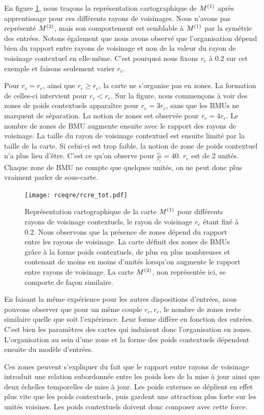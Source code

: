 \documentclass[../main]{subfiles}
\begin{document}
En figure \ref{fig:rcre}, nous traçons la représentation cartographique de $M^{({1})}$ après apprentissage pour ces différents rayons de voisinages. 
Nous n'avons pas représenté $M^{({2})}$, mais son comportement est semblable à $M^{({1})}$ par la symétrie des entrées.
Notons également que nous avons observé que l'organisation dépend bien du rapport entre rayons de voisinage et non de la valeur du rayon de voisinage contextuel en elle-même. C'est pourquoi nous fixons $r_e$ à $0.2$ sur cet exemple et faisons seulement varier $r_c$.

Pour $r_c = r_e$, ainsi que $r_c \geq r_e$, la carte ne s'organise pas en zones. 
La formation de celles-ci intervient pour $r_c < r_e$. Sur la figure, nous commençons à voir des zones de poids contextuels apparaître pour $r_e = 3r_c$, sans que les BMUs ne marquent de séparation. La notion de zones est observée pour $r_e = 4r_c$.
Le nombre de zones de BMU augmente ensuite avec le rapport des rayons de voisinage. La taille du rayon de voisinage contextuel est ensuite limité par la taille de la carte. Si celui-ci est trop faible, la notion de zone de poids contextuel n'a plus lieu d'être. C'est ce qu'on observe pour $\frac{r_e}{r_c} = 40$. $r_c$ est de $2$ unités. Chaque zone de BMU ne compte que quelques unités, on ne peut donc plus vraiment parler de sous-carte.

\begin{figure}[H]
	\texttt{[image: rceqre/rcre\_tot.pdf]}
	\caption{Représentation cartographique de la carte $M^{({1})}$ pour différents rayons de voisinage contextuels, le rayon de voisinage $r_e$ étant fixé à $0.2$. Nous observons que la présence de zones dépend du rapport entre les rayons de voisinage. La carte définit des zones de BMUs grâce à la forme poids contextuels, de plus en plus nombreuses et contenant de moins en moins d'unités lorsqu'on augmente le rapport entre rayons de voisinage.
	La carte $M^{({2})}$, non représentée ici, se comporte de façon similaire.\label{fig:rcre}
	}
\end{figure}	

En faisant la même expérience pour les autres dispositions d'entrées, nous pouvons observer que pour un même couple $r_e,r_c$, le nombre de zones reste similaire quelle que soit l'expérience. Leur forme diffère en fonction des entrées.
C'est bien les paramètres des cartes qui induisent donc l'organisation en zones.
L'organisation au sein d'une zone et la forme des poids contextuels dépendent ensuite du modèle d'entrées.

Ces zones peuvent s'expliquer du fait que le rapport entre rayons de voisinage introduit une relation subordonnée entre les poids lors de la mise à jour ainsi que deux échelles temporelles de mise à jour. 
Les poids externes se déplient en effet plus vite que les poids contextuels, puis gardent une \og attraction \fg{} plus forte sur les unités voisines. Les poids contextuels doivent donc composer avec cette force.
\end{document}

